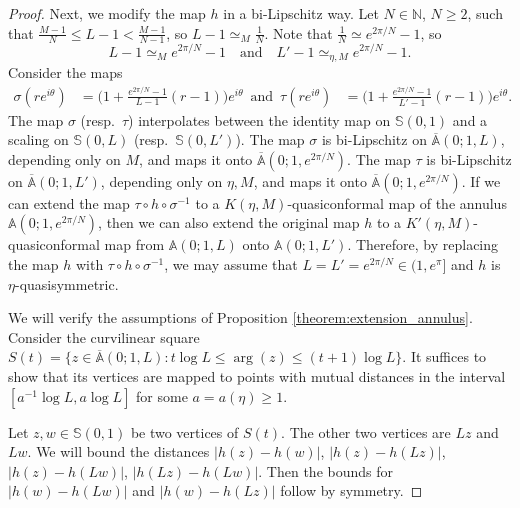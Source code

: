 \documentclass[letterpaper]{amsart}
\theoremstyle{plain}
\theoremstyle{definition}
\theoremstyle{remark}
\numberwithin{equation}{section}
\numberwithin{theorem}{section}
\renewcommand{\bar}{\overline}
\newcommand{\N}{\mathbb N}
\begin{document}
\begin{proof}
Next, we modify the map $h$ in a bi-Lipschitz way. Let $N\in \N$, $N\geq 2$, such that $\frac{M-1}{N}\leq  L-1<\frac{M-1}{N-1}$, so $L-1\simeq_M\frac{1}{N}$. Note that $\frac{1}{N}\simeq e^{2\pi/N}-1$, so  
$$L-1\simeq_{M} e^{2\pi/N}-1\quad \text{and}\quad L'-1\simeq_{\eta,M}e^{2\pi/N}-1.$$
Consider the maps
\begin{align*}
\sigma(re^{i\theta}) &= \bigg(1+ \frac{e^{2\pi/N}-1}{L-1}(r-1)\bigg) e^{i\theta}\,\,\, \text{and} \,\,\, \tau(re^{i\theta}) &= \bigg(1+ \frac{e^{2\pi/N}-1}{L'-1}(r-1) \bigg) e^{i\theta}.
\end{align*}
The map $\sigma$ (resp.\ $\tau$) interpolates between the identity map on $\mathbb S(0,1)$ and a scaling on $\mathbb S(0,L)$ (resp.\ $\mathbb S(0,L')$). The map $\sigma$ is  bi-Lipschitz on $\bar{ \mathbb A}(0;1,L)$, depending only on $M$, and maps it onto $\bar{\mathbb A}(0;1,e^{2\pi/N})$. The map $\tau$ is bi-Lipschitz on $\bar{ \mathbb A}(0;1,L')$, depending only on $\eta,M$, and maps it onto $\bar{\mathbb A}(0;1,e^{2\pi/N})$. If we can extend the map $\tau \circ h\circ \sigma^{-1}$ to a $K(\eta,M)$-quasiconformal map of the annulus $\mathbb A(0;1,e^{2\pi/N})$, then we can also extend the original map $h$ to a $K'(\eta,M)$-quasiconformal map from $\mathbb A(0;1,L)$ onto $\mathbb A(0;1,L')$. Therefore, by replacing the map $h$ with $\tau \circ h\circ \sigma^{-1}$, we may assume that $L=L'=e^{2\pi/N}\in (1,e^{\pi}]$ and $h$ is $\eta$-quasisymmetric.

We will verify the assumptions of Proposition \ref{theorem:extension_annulus}. Consider the curvilinear square $S(t)=\{z\in \bar {\mathbb A}(0;1,L): t\log L\leq   \arg(z)\leq (t+1)\log L\}$. It suffices to show that its vertices are mapped to points with mutual distances in the interval $[a^{-1}\log L, a\log L]$ for some $a=a(\eta)\geq 1$.

Let $z,w\in \mathbb S(0,1)$ be two vertices of $S(t)$. The other two vertices are $Lz$ and $Lw$. We will bound the distances $|h(z)-h(w)|$, $|h(z)-h(Lz)|$, $|h(z)-h(Lw)|$, $|h(Lz)-h(Lw)|$. Then the bounds for $|h(w)-h(Lw)|$ and $|h(w)-h(Lz)|$ follow by symmetry. 


\end{proof}
\end{document}
